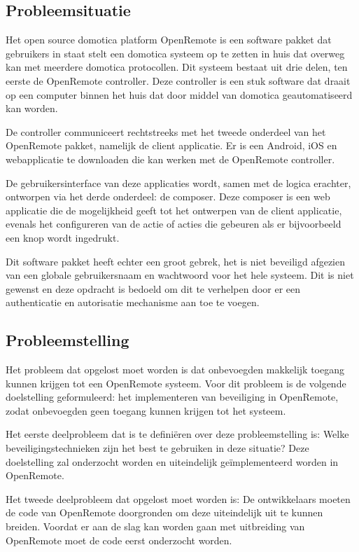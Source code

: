 \documentclass[]{article}
\begin{document}
\subsection{Probleemsituatie}

Het open source domotica platform OpenRemote is een software pakket dat
gebruikers in staat stelt een domotica systeem op te zetten in huis dat
overweg kan met meerdere domotica protocollen. Dit systeem bestaat uit drie
delen, ten eerste de OpenRemote controller. Deze controller is een stuk
software dat draait op een computer binnen het huis dat door middel van
domotica geautomatiseerd kan worden.

De controller communiceert rechtstreeks met het tweede onderdeel van het
OpenRemote pakket, namelijk de client applicatie. Er is een Android, iOS en
webapplicatie te downloaden die kan werken met de OpenRemote controller.

De gebruikersinterface van deze applicaties wordt, samen met de logica
erachter, ontworpen via het derde onderdeel: de composer. Deze composer is
een web applicatie die de mogelijkheid geeft tot het ontwerpen van de
client applicatie, evenals het configureren van de actie of acties die
gebeuren als er bijvoorbeeld een knop wordt ingedrukt.

Dit software pakket heeft echter een groot gebrek, het is niet beveiligd
afgezien van een globale gebruikersnaam en wachtwoord voor het hele
systeem. Dit is niet gewenst en deze opdracht is bedoeld om dit te verhelpen door
er een authenticatie en autorisatie mechanisme aan toe te voegen.

\subsection{Probleemstelling}

Het probleem dat opgelost moet worden is dat onbevoegden makkelijk toegang
kunnen krijgen tot een OpenRemote systeem. Voor dit probleem is de
volgende doelstelling geformuleerd: het implementeren van beveiliging in
OpenRemote, zodat onbevoegden geen toegang kunnen krijgen tot het systeem.

Het eerste deelprobleem dat is te defini\"eren over deze probleemstelling is:
Welke beveiligingstechnieken zijn het best te gebruiken in deze situatie?
Deze doelstelling zal onderzocht worden en uiteindelijk ge\"implementeerd worden
in OpenRemote.

Het tweede deelprobleem dat opgelost moet worden is: De ontwikkelaars
moeten de code van OpenRemote doorgronden om deze uiteindelijk uit te
kunnen breiden. Voordat er aan de slag kan worden gaan met uitbreiding van
OpenRemote moet de code eerst onderzocht worden.
\end{document}
